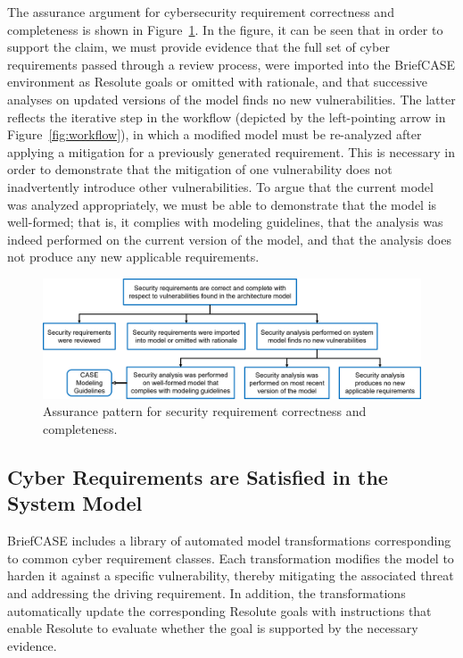 The assurance argument for cybersecurity requirement correctness and completeness is shown in Figure~\ref{fig:req-correct-complete}.  
%
In the figure, it can be seen that in order to support the claim, we must provide evidence that the full set of cyber requirements passed through a review process, were imported into the BriefCASE environment as Resolute goals or omitted with rationale, and that successive analyses on updated versions of the model finds no new vulnerabilities.  The latter reflects the iterative step in the workflow (depicted by the left-pointing arrow in Figure~\ref{fig:workflow}), in which a modified model must be re-analyzed after applying a mitigation for a previously generated requirement.  This is necessary in order to demonstrate that the mitigation of one vulnerability does not inadvertently introduce other vulnerabilities.  To argue that the current model was analyzed appropriately, we must be able to demonstrate that the model is well-formed; that is, it complies with modeling guidelines, that the analysis was indeed performed on the current version of the model, and that the analysis does not produce any new applicable requirements.

\begin{figure}[h] 
	\centering 
	\includegraphics[width=\textwidth]{figs/req-correct-complete.png}
	\caption{Assurance pattern for security requirement correctness and completeness.}
	\label{fig:req-correct-complete} 
\end{figure}

\subsection{Cyber Requirements are Satisfied in the System Model}
BriefCASE includes a library of automated model transformations corresponding to common cyber requirement classes.  Each transformation modifies the model to harden it against a specific vulnerability, thereby mitigating the associated threat and addressing the driving requirement.  In addition, the transformations automatically update the corresponding Resolute goals with instructions that enable Resolute to evaluate whether the goal is supported by the necessary evidence.

